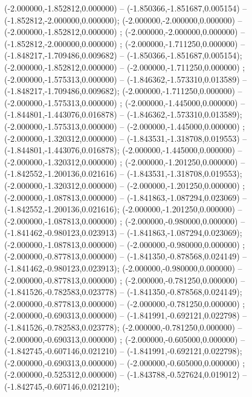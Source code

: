  (-2.000000,-1.852812,0.000000) -- (-1.850366,-1.851687,0.005154) -- (-1.852812,-2.000000,0.000000);
 (-2.000000,-2.000000,0.000000) -- (-2.000000,-1.852812,0.000000) ;
 (-2.000000,-2.000000,0.000000) -- (-1.852812,-2.000000,0.000000) ;
 (-2.000000,-1.711250,0.000000) -- (-1.848217,-1.709486,0.009682) -- (-1.850366,-1.851687,0.005154);
 (-2.000000,-1.852812,0.000000) -- (-2.000000,-1.711250,0.000000) ;
 (-2.000000,-1.575313,0.000000) -- (-1.846362,-1.573310,0.013589) -- (-1.848217,-1.709486,0.009682);
 (-2.000000,-1.711250,0.000000) -- (-2.000000,-1.575313,0.000000) ;
 (-2.000000,-1.445000,0.000000) -- (-1.844801,-1.443076,0.016878) -- (-1.846362,-1.573310,0.013589);
 (-2.000000,-1.575313,0.000000) -- (-2.000000,-1.445000,0.000000) ;
 (-2.000000,-1.320312,0.000000) -- (-1.843531,-1.318708,0.019553) -- (-1.844801,-1.443076,0.016878);
 (-2.000000,-1.445000,0.000000) -- (-2.000000,-1.320312,0.000000) ;
 (-2.000000,-1.201250,0.000000) -- (-1.842552,-1.200136,0.021616) -- (-1.843531,-1.318708,0.019553);
 (-2.000000,-1.320312,0.000000) -- (-2.000000,-1.201250,0.000000) ;
 (-2.000000,-1.087813,0.000000) -- (-1.841863,-1.087294,0.023069) -- (-1.842552,-1.200136,0.021616);
 (-2.000000,-1.201250,0.000000) -- (-2.000000,-1.087813,0.000000) ;
 (-2.000000,-0.980000,0.000000) -- (-1.841462,-0.980123,0.023913) -- (-1.841863,-1.087294,0.023069);
 (-2.000000,-1.087813,0.000000) -- (-2.000000,-0.980000,0.000000) ;
 (-2.000000,-0.877813,0.000000) -- (-1.841350,-0.878568,0.024149) -- (-1.841462,-0.980123,0.023913);
 (-2.000000,-0.980000,0.000000) -- (-2.000000,-0.877813,0.000000) ;
 (-2.000000,-0.781250,0.000000) -- (-1.841526,-0.782583,0.023778) -- (-1.841350,-0.878568,0.024149);
 (-2.000000,-0.877813,0.000000) -- (-2.000000,-0.781250,0.000000) ;
 (-2.000000,-0.690313,0.000000) -- (-1.841991,-0.692121,0.022798) -- (-1.841526,-0.782583,0.023778);
 (-2.000000,-0.781250,0.000000) -- (-2.000000,-0.690313,0.000000) ;
 (-2.000000,-0.605000,0.000000) -- (-1.842745,-0.607146,0.021210) -- (-1.841991,-0.692121,0.022798);
 (-2.000000,-0.690313,0.000000) -- (-2.000000,-0.605000,0.000000) ;
 (-2.000000,-0.525312,0.000000) -- (-1.843788,-0.527624,0.019012) -- (-1.842745,-0.607146,0.021210);

